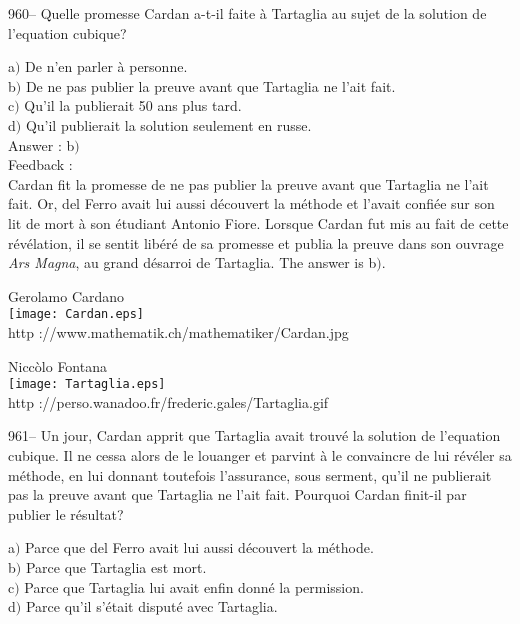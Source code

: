 ﻿\documentclass[letterpaper, 12pt]{article}
\begin{document}
960-- Quelle promesse Cardan a-t-il faite \`a Tartaglia au sujet de
la solution de l'equation cubique?

a$)$ De n'en parler \`a personne.\\
b$)$ De ne pas publier la preuve avant que Tartaglia ne l'ait fait.  \\
c$)$ Qu'il la publierait 50 ans plus tard.  \\
d$)$ Qu'il publierait la solution seulement en russe. \\

Answer : b$)$\\

Feedback :\\
Cardan fit la promesse de ne pas publier la preuve avant que
Tartaglia ne l'ait fait. Or, del Ferro avait lui aussi d\'ecouvert
la m\'ethode et l'avait confi\'ee sur son lit de mort \`a son
\'etudiant Antonio Fiore. Lorsque Cardan fut mis au fait de cette
r\'ev\'elation,
il se sentit lib\'er\'e de sa promesse et publia la preuve dans son ouvrage
{\sl Ars Magna}, au grand d\'esarroi de Tartaglia. The answer is b$)$.\\
        \begin{center}
        Gerolamo Cardano\\
    \texttt{[image: Cardan.eps]}\\
        {\footnotesize http ://www.mathematik.ch/mathematiker/Cardan.jpg}
    \end{center}

        \begin{center}
        Nicc\`olo Fontana\\
    \texttt{[image: Tartaglia.eps]}\\
        {\footnotesize http
://perso.wanadoo.fr/frederic.gales/Tartaglia.gif}
    \end{center}

961-- Un jour, Cardan apprit que Tartaglia avait trouv\'e la
solution de l'equation cubique. Il ne cessa alors de le louanger
et parvint \`a le convaincre de lui r\'ev\'eler sa m\'ethode, en lui
donnant toutefois l'assurance, sous serment, qu'il ne publierait pas
la preuve avant que Tartaglia ne l'ait fait. Pourquoi Cardan
finit-il par publier le r\'esultat?

a$)$ Parce que del Ferro avait lui aussi d\'ecouvert la m\'ethode. \\
b$)$ Parce que Tartaglia est mort.  \\
c$)$ Parce que Tartaglia lui avait enfin donn\'e la permission.  \\
d$)$ Parce qu'il s'\'etait disput\'e avec Tartaglia. \\
\end{document}
